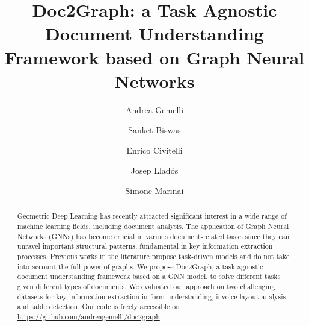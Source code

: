 \documentclass[runningheads]{llncs}
\begin{document}
\pagestyle{headings}
\mainmatter
\def\ECCVSubNumber{14}  

\title{Doc2Graph: a Task Agnostic Document Understanding Framework based on Graph Neural Networks} 

\begin{comment}
\titlerunning{ECCV-22 submission ID \ECCVSubNumber} 
\authorrunning{ECCV-22 submission ID \ECCVSubNumber} 
\author{Anonymous ECCV submission}
\institute{Paper ID \ECCVSubNumber}
\end{comment}


\author{Andrea Gemelli \and
Sanket Biswas \and
Enrico Civitelli \and
Josep Lladós \and
Simone Marinai}


\maketitle

\begin{abstract}
Geometric Deep Learning has recently attracted significant
interest in a wide range of machine learning fields, including document analysis. The application of Graph Neural Networks (GNNs) has become crucial in various document-related tasks since they can unravel important structural patterns, fundamental in key information extraction processes. Previous works in the literature propose task-driven models and do not take into account the full power of graphs. We propose Doc2Graph, a task-agnostic document understanding framework based on a GNN model, to solve different tasks given different types of documents. We evaluated our approach on two challenging datasets for key information extraction in form understanding, invoice layout analysis and table detection. Our code is freely accessible on \url{https://github.com/andreagemelli/doc2graph}.

\end{abstract}
\end{document}
